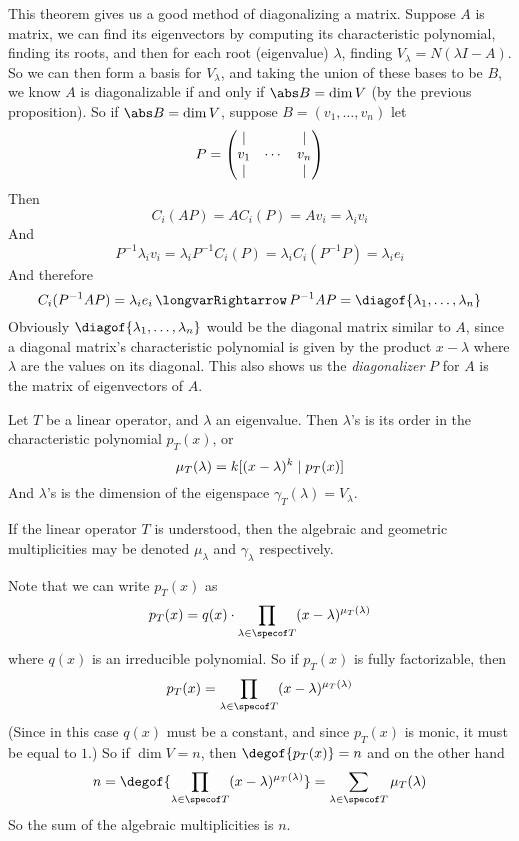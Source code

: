 This theorem gives us a good method of diagonalizing a matrix.
Suppose $A$ is matrix, we can find its eigenvectors by computing its characteristic polynomial, finding its roots, and then for each root (eigenvalue) $\lambda$, finding $V_\lambda=N(\lambda I-A)$.
So we can then form a basis for $V_\lambda$, and taking the union of these bases to be $B$, we know $A$ is diagonalizable if and only if $\abs B=\dim V$ (by the previous proposition).
So if $\abs B=\dim V$, suppose $B=(v_1,\dots,v_n)$ let
\[ P = \begin{pmatrix}\vert & & \vert \\ v_1 & \cdots & v_n \\ \vert & & \vert\end{pmatrix} \]
Then
\[ C_i(AP) = AC_i(P) = Av_i = \lambda_i v_i \]
And
\[ P^{-1}\lambda_iv_i = \lambda_iP^{-1}C_i(P) = \lambda_iC_i(P^{-1}P) = \lambda_ie_i \]
And therefore
\[ C_i(P^{-1}AP) = \lambda_ie_i \implies P^{-1}AP = \diagof{\lambda_1,\dots,\lambda_n} \]
Obviously $\diagof{\lambda_1,\dots,\lambda_n}$ would be the diagonal matrix similar to $A$, since a diagonal matrix's characteristic polynomial is given by the product $x-\lambda$ where $\lambda$ are the
values on its diagonal.
This also shows us the \emph{diagonalizer} $P$ for $A$ is the matrix of eigenvectors of $A$.

\begin{defn*}

    Let $T$ be a linear operator, and $\lambda$ an eigenvalue.
    Then $\lambda$'s  is its order in the characteristic polynomial $p_T(x)$, or
    \[ \mu_T(\lambda) = \maxof{k}[(x-\lambda)^k\divides p_T(x)] \]
    And $\lambda$'s  is the dimension of the eigenspace $\gamma_T(\lambda)=V_\lambda$.

    If the linear operator $T$ is understood, then the algebraic and geometric multiplicities may be denoted $\mu_\lambda$ and $\gamma_\lambda$ respectively.

\end{defn*}

Note that we can write $p_T(x)$ as
\[ p_T(x) = q(x)\cdot\prod_{\lambda\in\specof T}(x-\lambda)^{\mu_T(\lambda)} \]
where $q(x)$ is an irreducible polynomial.
So if $p_T(x)$ is fully factorizable, then
\[ p_T(x) = \prod_{\lambda\in\specof T}(x-\lambda)^{\mu_T(\lambda)} \]
(Since in this case $q(x)$ must be a constant, and since $p_T(x)$ is monic, it must be equal to $1$.)
So if $\dim V=n$, then $\degof{p_T(x)}=n$ and on the other hand
\[ n = \degof{\prod_{\lambda\in\specof T}(x-\lambda)^{\mu_T(\lambda)}} = \sum_{\lambda\in\specof T}\mu_T(\lambda) \]
So the sum of the algebraic multiplicities is $n$.

